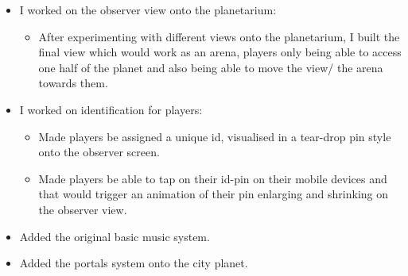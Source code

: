 \documentclass[11pt,a4paper]{article}
\begin{document}
\begin{itemize}
\begin{itemize}
          \end{itemize}
          \item I worked on the observer view onto the planetarium:
          \begin{itemize}
            \item After experimenting with different views onto the planetarium, I built the final view which would work as an arena, players only being able to access one half of the planet and also being able to move the view/ the arena towards them.
          \end{itemize}
          \item I worked on identification for players:
          \begin{itemize}
          \item Made players be assigned a unique id, visualised in a tear-drop pin style onto the observer screen.
          \item Made players be able to tap on their id-pin on their mobile devices and that would trigger an animation of their pin enlarging and shrinking on the observer view.
          \end{itemize}
          \item Added the original basic music system.
          \item Added the portals system onto the city planet.
        \end{itemize}

        \pagebreak
\end{document}
